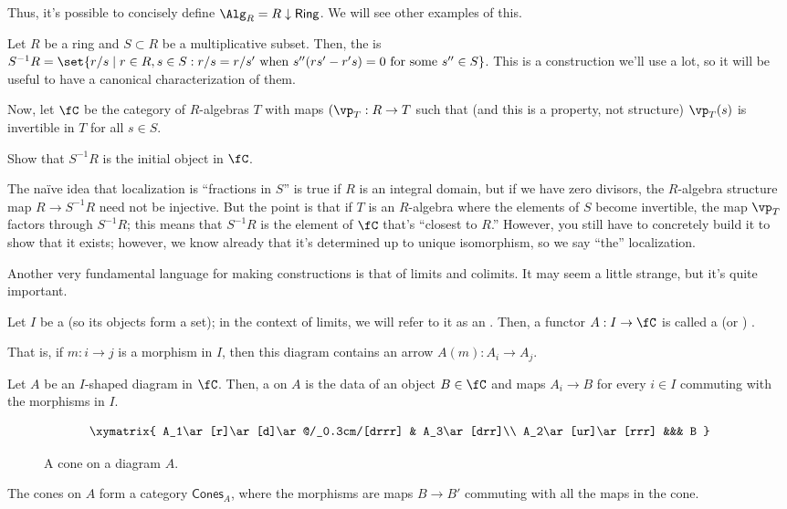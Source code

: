 Thus, it's possible to concisely define \(\Alg_R = R\downarrow\mathsf{Ring}\). We will see other examples of this.
\begin{exm}[Localization]
Let \(R\) be a ring and \(S\subset R\) be a multiplicative subset. Then, the  is
\(S^{-1}R = \set{r/s\mid r\in R, s\in S: r/s = r/s'\text{ when } s''(rs' - r's) = 0\text{ for some } s''\in S}\).
This is a construction we'll use a lot, so it will be useful to have a canonical characterization of them.

Now, let \(\fC\) be the category of \(R\)-algebras \(T\) with maps \((\vp_T:R\to T\) such that (and this is
a property, not structure) \(\vp_T(s)\) is invertible in \(T\) for all \(s\in S\).
\begin{ex}
Show that \(S^{-1}R\) is the initial object in \(\fC\).
\end{ex}
The naïve idea that localization is ``fractions in \(S\)'' is true if \(R\) is an integral domain, but if
we have zero divisors, the \(R\)-algebra structure map \(R\to S^{-1}R\) need not be injective. But the point is
that if \(T\) is an \(R\)-algebra where the elements of \(S\) become invertible, the map \(\vp_T\) factors through
\(S^{-1}R\); this means that \(S^{-1}R\) is the element of \(\fC\) that's ``closest to \(R\).'' However, you still
have to concretely build it to show that it exists; however, we know already that it's determined up to unique
isomorphism, so we say ``the'' localization.
\end{exm}
Another very fundamental language for making constructions is that of limits and colimits. It may seem a little
strange, but it's quite important.
\begin{defn}
Let \(I\) be a  (so its objects form a set); in the context of limits, we will refer to it as
an . Then, a functor \(A:I\to\fC\) is called a  (or )
.
\end{defn}
That is, if \(m:i\to j\) is a morphism in \(I\), then this diagram contains an arrow \(A(m): A_i\to A_j\).
\begin{defn}
Let \(A\) be an \(I\)-shaped diagram in \(\fC\). Then, a  on \(A\) is the data of an object \(B\in\fC\)
and maps \(A_i\to B\) for every \(i\in I\) commuting with the morphisms in \(I\).
\begin{figure}[h!]
\[\xymatrix{
	A_1\ar[r]\ar[d]\ar@/_0.3cm/[drrr] & A_3\ar[drr]\\
	A_2\ar[ur]\ar[rrr] &&& B
}\]
\caption{A cone on a diagram \(A\).}
\end{figure}
The cones on \(A\) form a category \(\mathsf{Cones}_A\), where the morphisms are maps \(B\to B'\) commuting with
all the maps in the cone.
\end{defn}

